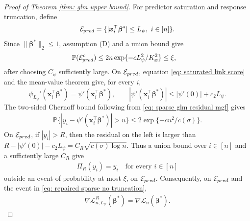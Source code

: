 \documentclass[letterpaper,12pt]{article}
\numberwithin{equation}{section}
\theoremstyle{plain}
\numberwithin{Theorem}{section}
\numberwithin{proposition}{section}
\numberwithin{Lemma}{section}
{
	\theoremstyle{definition}
	\newtheorem{Definition}{Definition}
	\newtheorem{example}{Example}
	\numberwithin{example}{section}
	\newtheorem{fact}{Fact}
	\numberwithin{fact}{section}
	\newtheorem{remark}{Remark}
}
\newcommand{\1}{\mathbbm{1}}
\def\bbeta{{\boldsymbol{\beta}}}
\def\Pr{\mathbb P}
\def\L{{\mathcal L}}
\begin{document}
\begin{proof}[Proof of Theorem \ref{thm: glm upper bound}]
For predictor saturation and response truncation, define
\[
\mathcal E_{\rm pred}
=\{|\bm x_i^\top\bbeta^*|\leq L_\psi,\ i\in[n]\}.
\]
Since $\|\bbeta^*\|_2\leq1$, assumption (D) and a union bound give
\begin{align}
\Pr(\mathcal E_{\rm pred}^c)
&\leq2n\exp\{-cL_\psi^2/K_{\bm x}^2\}
\leq\xi,                                                   \label{eq: repaired sparse no score saturation}
\end{align}
after choosing $C_\psi$ sufficiently large. On
$\mathcal E_{\rm pred}$, equation \eqref{eq: saturated link score}
and the mean-value theorem give, for every $i$,
\[
\psi_{L_\psi}'(\bm x_i^\top\bbeta^*)
=\psi'(\bm x_i^\top\bbeta^*),
\qquad
|\psi'(\bm x_i^\top\bbeta^*)|
\leq|\psi'(0)|+c_2L_\psi.
\]
The two-sided Chernoff bound following from
\eqref{eq: sparse glm residual mgf} gives
\begin{align*}
\Pr\{|y_i-\psi'(\bm x_i^\top\bbeta^*)|>u\}
\leq2\exp\{-cu^2/c(\sigma)\}.
\end{align*}
On $\mathcal E_{\rm pred}$, if $|y_i|>R$, then the residual on the
left is larger than
$R-|\psi'(0)|-c_2L_\psi=C_R\sqrt{c(\sigma)\log n}$.
Thus a union bound over $i\in[n]$ and a sufficiently large $C_R$ give
\begin{align}
    \Pi_R(y_i)=y_i\quad\text{for every }i\in[n]              \label{eq: repaired sparse no truncation}
\end{align}
outside an event of probability at most $\xi$, on
$\mathcal E_{\rm pred}$. Consequently, on $\mathcal E_{\rm pred}$ and
the event in \eqref{eq: repaired sparse no truncation},
\begin{align}
\nabla\L_{n,L_\psi}^R(\bbeta^*)
=\nabla\L_n(\bbeta^*).                                    \label{eq: sparse saturated score coupling at truth}
\end{align}


\end{proof}
\end{document}

